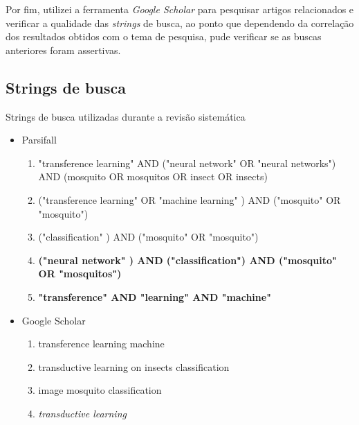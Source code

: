 \documentclass[conference]{IEEEtran}
\begin{document}
Por fim, utilizei a ferramenta \emph{Google Scholar} para pesquisar artigos relacionados e verificar a qualidade das \emph{strings} de busca, ao ponto que dependendo da correlação dos resultados obtidos com o tema de pesquisa, pude verificar se as buscas anteriores foram assertivas.


\subsection{Strings de busca}
\label{cap:string_busca}
Strings de busca utilizadas durante a revisão sistemática

\begin{itemize}

    \item Parsifall
    \begin{enumerate}
        \item "transference learning" AND ("neural network" OR "neural networks") AND (mosquito OR mosquitos OR insect OR insects)
        
        \item ("transference learning" OR "machine learning" ) AND ("mosquito" OR "mosquito")
        
        \item ("classification" ) AND ("mosquito" OR "mosquito")
    
        \item \textbf{("neural network" ) AND ("classification") AND ("mosquito" OR "mosquitos")}
    
        \item \textbf{"transference" AND "learning" AND "machine"}
        

    \end{enumerate}

    \item Google Scholar
    \begin{enumerate}
        \item transference learning machine 
        \item transductive learning on insects classification
        \item image mosquito classification
        \item \emph{transductive learning}
    \end{enumerate}
    
\end{itemize}
\end{document}

